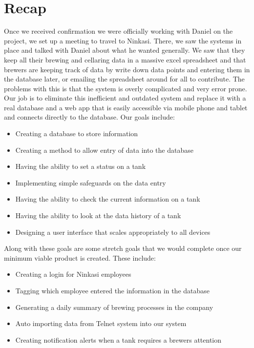\documentclass[draftclsnofoot,onecolumn,letterpaper,10pt,compsoc]{IEEEtran}
\begin{document}
\section{Recap}
Once we received confirmation we were officially working with Daniel on the project, we set up a meeting to travel to Ninkasi.
There, we saw the systems in place and talked with Daniel about what he wanted generally.
We saw that they keep all their brewing and cellaring data in a massive excel spreadsheet and that brewers are keeping track of data by write down data points and entering them in the database later, or emailing the spreadsheet around for all to contribute.
The problems with this is that the system is overly complicated and very error prone.
Our job is to eliminate this inefficient and outdated system and replace it with a real database and a web app that is easily accessible via mobile phone and tablet and connects directly to the database. Our goals include:
\begin{itemize}
  \item Creating a database to store information
  \item Creating a method to allow entry of data into the database
  \item Having the ability to set a status on a tank
  \item Implementing simple safeguards on the data entry
  \item Having the ability to check the current information on a tank
  \item Having the ability to look at the data history of a tank
  \item Designing a user interface that scales appropriately to all devices
\end{itemize}
Along with these goals are some stretch goals that we would complete once our minimum viable product is created. These include:
\begin{itemize}
  \item Creating a login for Ninkasi employees
  \item Tagging which employee entered the information in the database
  \item Generating a daily summary of brewing processes in the company
  \item Auto importing data from Telnet system into our system
  \item Creating notification alerts when a tank requires a brewers attention
\end{itemize}
\end{document}
